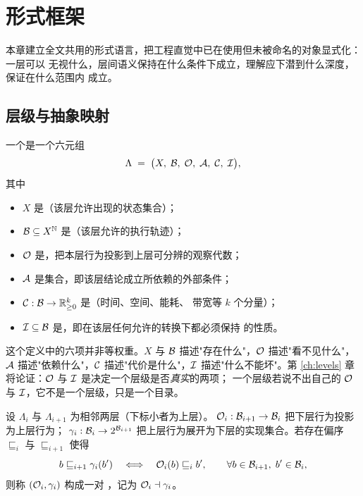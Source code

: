 \chapter[形式框架]{形式框架}\label{ch:framework}

本章建立全文共用的形式语言，把工程直觉中已在使用但未被命名的对象显式化：一层可以
无视什么，层间语义保持在什么条件下成立，理解应下潜到什么深度，保证在什么范围内
成立。

\section{层级与抽象映射}\label{sec:level}

\begin{definition}[层级]\label{def:level}
一个是一个六元组
\[
\Lambda \;=\; \bigl(X,\; \mathcal{B},\; \mathcal{O},\; \mathcal{A},\; \mathcal{C},\; \mathcal{I}\bigr),
\]
其中
\begin{itemize}
\item $X$ 是（该层允许出现的状态集合）；
\item $\mathcal{B} \subseteq X^{\mathbb{N}}$ 是（该层允许的执行轨迹）；
\item $\mathcal{O}$ 是，把本层行为投影到上层可分辨的观察代数；
\item $\mathcal{A}$ 是集合，即该层结论成立所依赖的外部条件；
\item $\mathcal{C} : \mathcal{B} \to \mathbb{R}_{\ge 0}^{k}$ 是（时间、空间、能耗、
      带宽等 $k$ 个分量）；
\item $\mathcal{I} \subseteq \mathcal{B}$ 是，即在该层任何允许的转换下都必须保持
      的性质。
\end{itemize}
\end{definition}

这个定义中的六项并非等权重。$X$ 与 $\mathcal{B}$ 描述"存在什么"，$\mathcal{O}$ 描述"看不见什么"，
$\mathcal{A}$ 描述"依赖什么"，$\mathcal{C}$ 描述"代价是什么"，$\mathcal{I}$ 描述"什么不能坏"。第
\ref{ch:levels} 章将论证：$\mathcal{O}$ 与 $\mathcal{I}$ 是决定一个层级是否\emph{真实}的两项；
一个层级若说不出自己的 $\mathcal{O}$ 与 $\mathcal{I}$，它不是一个层级，只是一个目录。

\begin{definition}[抽象与具体化]\label{def:galois}
设 $\Lambda_i$ 与 $\Lambda_{i+1}$ 为相邻两层（下标小者为上层）。
$\mathcal{O}_i : \mathcal{B}_{i+1} \to \mathcal{B}_i$ 把下层行为投影为上层行为；
$\gamma_i : \mathcal{B}_i \to 2^{\mathcal{B}_{i+1}}$ 把上层行为展开为下层的实现集合。若存在偏序
$\sqsubseteq_i$ 与 $\sqsubseteq_{i+1}$ 使得
\begin{equation}\label{eq:galois}
b \sqsubseteq_{i+1} \gamma_i(b') \quad\Longleftrightarrow\quad \mathcal{O}_i(b) \sqsubseteq_i b',
\qquad \forall b \in \mathcal{B}_{i+1},\; b' \in \mathcal{B}_i,
\end{equation}
则称 $(\mathcal{O}_i, \gamma_i)$ 构成一对 ，记为 $\mathcal{O}_i \dashv \gamma_i$。
\end{definition}

